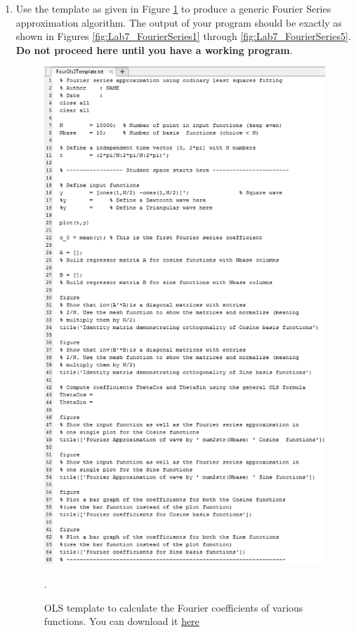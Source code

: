 \documentclass[11pt,letterpaper]{article}
\begin{document}
\begin{enumerate}
\item Use the template as given in Figure \ref{fig:Lab7_FourierSeriesTemplate} to produce a generic Fourier Series approximation algorithm. The output of your program should be exactly as shown in Figures \ref{fig:Lab7_FourierSeries1} through \ref{fig:Lab7_FourierSeries5}. \textbf{Do not proceed here until you have a working program}.

\begin{figure}
\centering
\includegraphics[width=0.7\linewidth]{Lab7_FourierSeriesTemplate}
\caption{OLS template to calculate the Fourier coefficients of various functions. You can download it \href{http://abe-research.illinois.edu/Faculty/grift/ABE425_2015/Labs/FourOls2Template.txt}{here}}.
\label{fig:Lab7_FourierSeriesTemplate}
\end{figure}


\end{enumerate}
\end{document}
